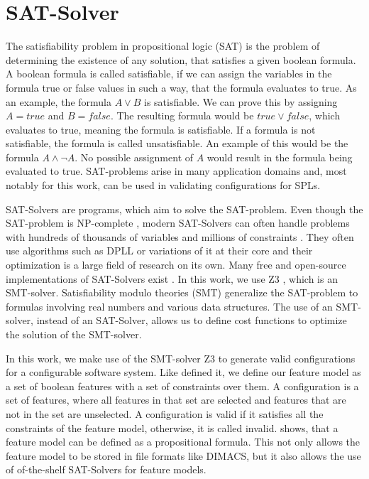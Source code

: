 \documentclass[../../thesis.tex]{subfiles}
\begin{document}
\section{SAT-Solver}
The satisfiability problem in propositional logic (SAT) is the problem of determining the existence of any solution,
that satisfies a given boolean formula. A boolean formula is called satisfiable, if we can assign the variables
in the formula true or false values in such a way, that the formula evaluates to true.
As an example, the formula $A \lor B$ is satisfiable. We can prove this by assigning $A=true$ and $B=false$.
The resulting formula would be $true \lor false$, which evaluates to true, meaning the formula is satisfiable.
If a formula is not satisfiable, the formula is called unsatisfiable. An example of this would be the
formula $A \land \lnot A$. No possible assignment of $A$ would result in the formula being evaluated to true.
SAT-problems arise in many application domains and, most notably for this work, can be used in validating
configurations for SPLs.

SAT-Solvers are programs, which aim to solve the SAT-problem. Even though the SAT-problem is NP-complete \cite{cook1971complexity},
modern SAT-Solvers can often handle problems with hundreds of thousands of variables and millions of constraints \cite{ohrimenko2009propagation}.
They often use algorithms such as DPLL \cite{sinz2007visualizing} or variations of it at their core and their optimization is a large
field of research on its own.
Many free and open-source implementations of SAT-Solvers exist \cite{web:minisat, web:BatSat,web:SATurne}.
In this work, we use Z3 \cite{web:z3}, which is an SMT-solver. Satisfiability modulo theories (SMT) generalize the
SAT-problem to formulas involving real numbers and various data structures. The use of an SMT-solver,
instead of an SAT-Solver, allows us to define cost functions to optimize the solution of the SMT-solver.

In this work, we make use of the SMT-solver Z3 to generate valid configurations for a configurable software system.
Like \citet{henard2014bypassing} defined it, we define our feature model as a set of boolean features
with a set of constraints over them. A configuration is a set of features, where all features in that
set are selected and features that are not in the set are unselected. A configuration is valid if it
satisfies all the constraints of the feature model, otherwise, it is called invalid.
\citet{batory2005feature} shows, that a feature model can be defined as a propositional formula. This not only allows
the feature model to be stored in file formats like DIMACS, but it also allows the use of of-the-shelf SAT-Solvers for
feature models.
\end{document}
